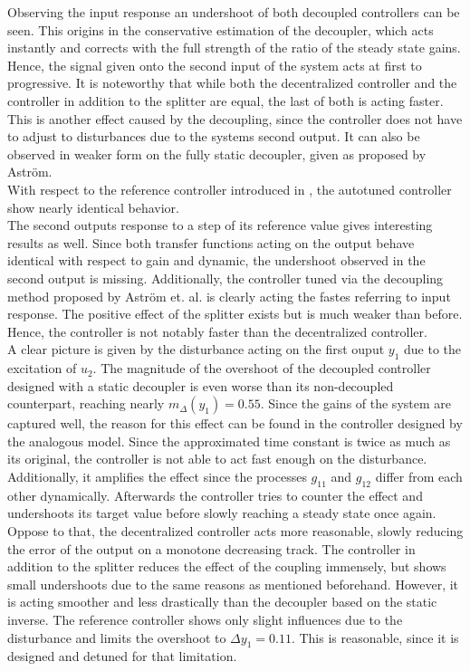 Observing the input response an undershoot of both decoupled controllers can be seen. This origins in the conservative estimation of the decoupler, which acts instantly and corrects with the full strength of the ratio of the steady state gains. Hence, the signal given onto the second input of the system acts at first to progressive. It is noteworthy that while both the decentralized controller and the controller in addition to the splitter are equal, the last of both is acting faster. This is another effect caused by the decoupling, since the controller does not have to adjust to disturbances due to the systems second output. It can also be observed in weaker form on the fully static decoupler, given as proposed by Astr\"om.\\

With respect to the reference controller introduced in \cite{Astrom2001a}, the autotuned controller show nearly identical behavior.\\

The second outputs response to a step of its reference value gives interesting results as well. Since both transfer functions acting on the output behave identical with respect to gain and dynamic, the undershoot observed in the second output is missing. Additionally, the controller tuned via the decoupling method proposed by Astr\"om et. al. is clearly acting the fastes referring to input response. The positive effect of the splitter exists but is much weaker than before. Hence, the controller is not notably faster than the decentralized controller.\\

A clear picture is given by the disturbance acting on the first ouput $y_1$ due to the excitation of $u_2$. The magnitude of the overshoot of the decoupled controller designed with a static decoupler is even worse than its non-decoupled counterpart, reaching nearly $m_{\Delta}(y_1) = 0.55$. Since the gains of the system are captured well, the reason for this effect can be found in the controller designed by the analogous model. Since the approximated time constant is twice as much as its original, the controller is not able to act fast enough on the disturbance. Additionally, it amplifies the effect since the processes $g_{11}$ and $g_{12}$ differ from each other dynamically. Afterwards the controller tries to counter the effect and undershoots its target value before slowly reaching a steady state once again.\\

Oppose to that, the decentralized controller acts more reasonable, slowly reducing the error of the output on a monotone decreasing track. The controller in addition to the splitter reduces the effect of the coupling immensely, but shows small undershoots due to the same reasons as mentioned beforehand. However, it is acting smoother and less drastically than the decoupler based on the static inverse. The reference controller shows only slight influences due to the disturbance and limits the overshoot to $\Delta y_1 = 0.11$. This is reasonable, since it is designed and detuned for that limitation.\\

